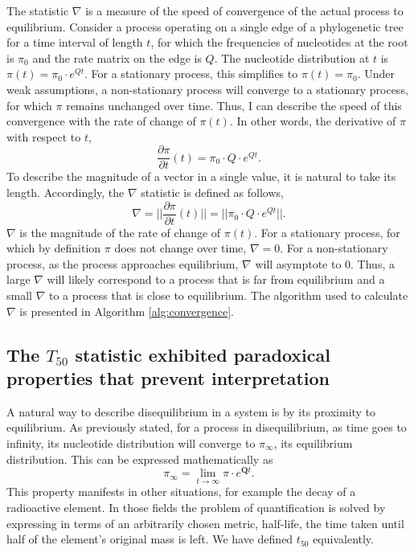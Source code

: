 The statistic $\nabla$ is a measure of the speed of convergence of the actual process to equilibrium. Consider a process operating on a single edge of a phylogenetic tree for a time interval of length $t$, for which the frequencies of nucleotides at the root is $\pi_0$ and the rate matrix on the edge is $Q$. The nucleotide distribution at $t$ is $\pi(t) = \pi_{0} \cdot e^{Qt}$. For a stationary process, this simplifies to $\pi(t) = \pi_{0}$. Under weak assumptions, a non-stationary process will converge to a stationary process, for which $\pi$ remains unchanged over time. Thus, I can describe the speed of this convergence with the rate of change of $\pi(t)$. In other words, the derivative of $\pi$ with respect to $t$,
\begin{equation}
\label{eq:dpi/dt}
\frac{\partial \pi}{\partial t}(t) = \pi_{0} \cdot Q \cdot e^{Qt}.
\end{equation}
To describe the magnitude of a vector in a single value, it is natural to take its length. Accordingly, the $\nabla$ statistic is defined as follows,
\begin{equation}
\label{eq:len-dpi/dt}
\nabla = ||\frac{\partial \pi}{\partial t}(t)|| =|| \pi_{0} \cdot Q \cdot e^{Qt}||.
\end{equation}
$\nabla$ is the magnitude of the rate of change of $\pi(t)$. For a stationary process, for which by definition $\pi$ does not change over time, $\nabla = 0$. For a non-stationary process, as the process approaches equilibrium, $\nabla$ will asymptote to $0$. Thus, a large $\nabla$ will likely correspond to a process that is far from equilibrium and a small $\nabla$ to a process that is close to equilibrium. The algorithm used to calculate $\nabla$ is presented in Algorithm \ref{alg:convergence}.



\subsection*{The $T_{50}$ statistic exhibited paradoxical properties that prevent interpretation}

A natural way to describe disequilibrium in a system is by its proximity to equilibrium. As previously stated, for a process in disequilibrium, as time goes to infinity, its nucleotide distribution will converge to $\pi_\infty$, its equilibrium distribution. This can be expressed mathematically as 
$$\pi_\infty = \lim_{t \to \infty}\pi \cdot e^{\mathbf{Q}t}.$$ 
This property manifests in other situations, for example the decay of a radioactive element. In those fields the problem of quantification is solved by expressing in terms of an arbitrarily chosen metric, half-life, the time taken until half of the element's original mass is left. We have defined ${t_{50}}$ equivalently.



